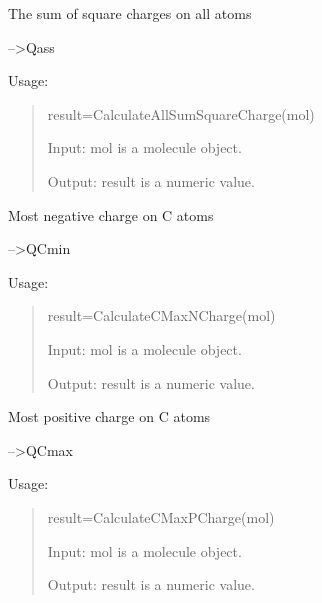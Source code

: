\documentclass[letterpaper,10pt,english]{sphinxmanual}
\begin{document}
\begin{fulllineitems}
\label{reference/charge:charge.CalculateAllSumSquareCharge}
The sum of square charges on all atoms

--\textgreater{}Qass

Usage:
\begin{quote}

result=CalculateAllSumSquareCharge(mol)

Input: mol is a molecule object.

Output: result is a numeric value.
\end{quote}

\end{fulllineitems}


\begin{fulllineitems}
\label{reference/charge:charge.CalculateCMaxNCharge}
Most negative charge on C atoms

--\textgreater{}QCmin

Usage:
\begin{quote}

result=CalculateCMaxNCharge(mol)

Input: mol is a molecule object.

Output: result is a numeric value.
\end{quote}

\end{fulllineitems}


\begin{fulllineitems}
\label{reference/charge:charge.CalculateCMaxPCharge}
Most positive charge on C atoms

--\textgreater{}QCmax

Usage:
\begin{quote}

result=CalculateCMaxPCharge(mol)

Input: mol is a molecule object.

Output: result is a numeric value.
\end{quote}

\end{fulllineitems}
\end{document}
